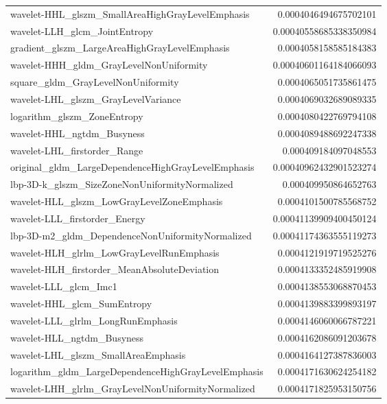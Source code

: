{\begin{xltabular}[H]{\textwidth}{X r}
        wavelet-HHL\_glszm\_SmallAreaHighGrayLevelEmphasis & 0.0004046494675702101 \\
        wavelet-LLH\_glcm\_JointEntropy & 0.00040558685338350984 \\
        gradient\_glszm\_LargeAreaHighGrayLevelEmphasis & 0.0004058158585184383 \\
        wavelet-HHH\_gldm\_GrayLevelNonUniformity & 0.00040601164184066093 \\
        square\_gldm\_GrayLevelNonUniformity & 0.0004065051735861475 \\
        wavelet-LHL\_glszm\_GrayLevelVariance & 0.0004069032689089335 \\
        logarithm\_glszm\_ZoneEntropy & 0.0004080422769794108 \\
        wavelet-HHL\_ngtdm\_Busyness & 0.0004089488692247338 \\
        wavelet-LHL\_firstorder\_Range & 0.000409184097048553 \\
        original\_gldm\_LargeDependenceHighGrayLevelEmphasis & 0.00040962432901523274 \\
        lbp-3D-k\_glszm\_SizeZoneNonUniformityNormalized & 0.000409950864652763 \\
        wavelet-HLL\_glszm\_LowGrayLevelZoneEmphasis & 0.0004101500785568752 \\
        wavelet-LLL\_firstorder\_Energy & 0.00041139909400450124 \\
        lbp-3D-m2\_gldm\_DependenceNonUniformityNormalized & 0.00041174363555119273 \\
        wavelet-HLH\_glrlm\_LowGrayLevelRunEmphasis & 0.0004121919719525276 \\
        wavelet-HLH\_firstorder\_MeanAbsoluteDeviation & 0.0004133352485919908 \\
        wavelet-LLL\_glcm\_Imc1 & 0.0004138553068870453 \\
        wavelet-HHL\_glcm\_SumEntropy & 0.0004139883399893197 \\
        wavelet-LLL\_glrlm\_LongRunEmphasis & 0.0004146060066787221 \\
        wavelet-HLL\_ngtdm\_Busyness & 0.0004162086091203678 \\
        wavelet-LHL\_glszm\_SmallAreaEmphasis & 0.0004164127387836003 \\
        logarithm\_gldm\_LargeDependenceHighGrayLevelEmphasis & 0.0004171630624254182 \\
        wavelet-LHH\_glrlm\_GrayLevelNonUniformityNormalized & 0.0004171825953150756 \\

\end{xltabular}}

